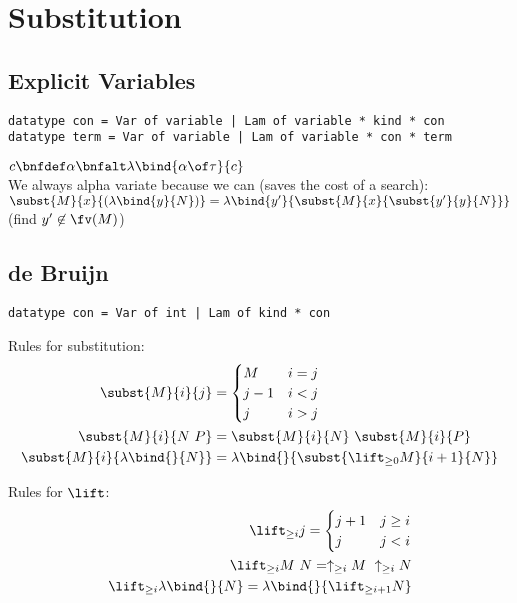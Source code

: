 \newpage
\section{Substitution}

\begin{grouped}{\subsection{Explicit Variables}}
\begin{lstlisting}
datatype con = Var of variable | Lam of variable * kind * con
datatype term = Var of variable | Lam of variable * con * term
\end{lstlisting}

$c \bnfdef \alpha \bnfalt \lambda\bind{\alpha \of \tau}{c}$\\
We always alpha variate because we can (saves the cost of a search):\\
$\subst{M}{x}{(\lambda\bind{y}{N})} = \lambda\bind{y'}{\subst{M}{x}{\subst{y'}{y}{N}}}$ (find $y' \not\in \fv(M)$)\\
\end{grouped}

\begin{grouped}{\subsection{de Bruijn}}
\begin{lstlisting}
datatype con = Var of int | Lam of kind * con
\end{lstlisting}

Rules for substitution:
\begin{align*}
\subst{M}{i}{j} &=
  \begin{cases} 
    M & i = j \\
    j - 1 & i < j \\
    j & i > j
  \end{cases}\\
\subst{M}{i}{N\ P} &= \subst{M}{i}{N}\ \subst{M}{i}{P} \\
\subst{M}{i}{\lambda\bind{}{N}} &= \lambda\bind{}{\subst{\lift_{\ge0}M}{i+1}{N}}
\end{align*}

Rules for $\lift$:
\begin{align*}
\lift_{\ge i} j = \begin{cases} j + 1 & j \ge i \\ j & j < i \end{cases} \\
\lift_{\ge i} M\ N = \uparrow_{\ge i} M\ \uparrow_{\ge i} N \\
\lift_{\ge i} \lambda\bind{}{N} = \lambda\bind{}{\lift_{\ge i + 1} N}
\end{align*}
\end{grouped}

